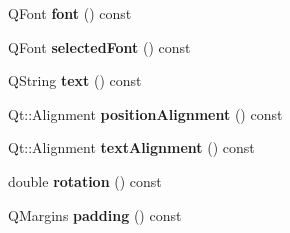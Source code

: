 \begin{DoxyCompactItemize}
\item 
Q\+Font {\bfseries font} () const \hypertarget{class_q_c_p_item_text_ad34943fd68a9b1451d3e3234d072e418}{}\label{class_q_c_p_item_text_ad34943fd68a9b1451d3e3234d072e418}

\item 
Q\+Font {\bfseries selected\+Font} () const \hypertarget{class_q_c_p_item_text_af2e7cacb1975132508714a51c5f48c3b}{}\label{class_q_c_p_item_text_af2e7cacb1975132508714a51c5f48c3b}

\item 
Q\+String {\bfseries text} () const \hypertarget{class_q_c_p_item_text_a9547f7832010486abed0837e75db5330}{}\label{class_q_c_p_item_text_a9547f7832010486abed0837e75db5330}

\item 
Qt\+::\+Alignment {\bfseries position\+Alignment} () const \hypertarget{class_q_c_p_item_text_af13c6adc480f268116ae72196eb44b06}{}\label{class_q_c_p_item_text_af13c6adc480f268116ae72196eb44b06}

\item 
Qt\+::\+Alignment {\bfseries text\+Alignment} () const \hypertarget{class_q_c_p_item_text_aaa1d84b3f61f9f2a0cce230e66ef7194}{}\label{class_q_c_p_item_text_aaa1d84b3f61f9f2a0cce230e66ef7194}

\item 
double {\bfseries rotation} () const \hypertarget{class_q_c_p_item_text_ae8991207fa1697511c1c8af9f3ca0e0a}{}\label{class_q_c_p_item_text_ae8991207fa1697511c1c8af9f3ca0e0a}

\item 
Q\+Margins {\bfseries padding} () const \hypertarget{class_q_c_p_item_text_a00e0fa03822ff384bf4921c1c90322ff}{}\label{class_q_c_p_item_text_a00e0fa03822ff384bf4921c1c90322ff}


\end{DoxyCompactItemize}
